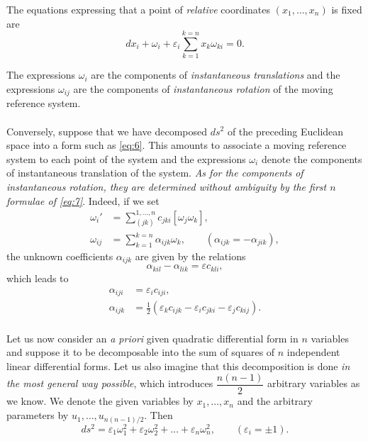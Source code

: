 \documentclass[leqno,12pt]{article}
\makeatletter
\let\old@epsilon\epsilon
\let\old@varepsilon\varepsilon
\let\epsilon\old@varepsilon
\let\varepsilon\old@epsilon
\theoremstyle{shape1}
\theoremstyle{shape0}
\theoremstyle{shape2}
\theoremstyle{definition}
\makeatother
\begin{document}
The equations expressing that a point of \emph{relative} coordinates $(x_{1},\dots,x_{n})$ is fixed are
\begin{equation}
  \label{eq:8}
  dx_{i}+\omega_{i}+\epsilon_{i}\sum_{k=1}^{k=n}x_{k}\omega_{ki}=0.
\end{equation}

The expressions $\omega_{i}$ are the components of \emph{instantaneous translations} and the expressions $\omega_{ij}$ are the components of \emph{instantaneous rotation} of the moving reference system.

\paragraph{}
\label{sec:4}
Conversely, suppose that we have decomposed $ds^{2}$ of the preceding Euclidean space into a form such as \eqref{eq:6}. This amounts to associate a moving reference system to each point of the system and the expressions $\omega_{i}$ denote the components of instantaneous translation of the system. \emph{As for the components of instantaneous rotation, they are determined without ambiguity by the first $n$ formulae of \eqref{eq:7}}. Indeed, if we set
\begin{align*}
  \omega_{i}'&=\sum_{(jk)}^{1,\dots,n}c_{jki}[\omega_{j}\omega_{k}],\\
  \omega_{ij}&=\sum_{k=1}^{k=n}\alpha_{ijk}\omega_{k},\qquad(\alpha_{ijk}=-\alpha_{jik}),
\end{align*}
the unknown coefficients $\alpha_{ijk}$ are given by the relations
\[
\alpha_{kil}-\alpha_{lik}=\epsilon c_{kli},
\]
which leads to
\begin{align*}
  \alpha_{iji}&=\epsilon_{i}c_{iji},\\
  \alpha_{ijk}&=\frac{1}{2}(\epsilon_{k}c_{ijk}-\epsilon_{i}c_{jki}-\epsilon_{j}c_{kij}).
\end{align*}

\paragraph{}
\label{sec:5}
Let us now consider an \emph{a priori} given quadratic differential form in $n$ variables and suppose it to be decomposable into the sum of squares of $n$ independent linear differential forms. Let us also imagine that this decomposition is done \emph{in the most general way possible}, which introduces $\dfrac{n(n-1)}{2}$ arbitrary variables as we know. We denote the given variables by $x_{1},\dots,x_{n}$ and the arbitrary parameters by $u_{1},\dots,u_{n(n-1)/2}$. Then
\begin{equation}
  \label{eq:9}
  ds^{2}=\epsilon_{1}\omega_{1}^{2}+\epsilon_{2}\omega_{2}^{2}+\dots+\epsilon_{n}\omega_{n}^{2},\qquad (\epsilon_{i}=\pm 1).
\end{equation}
\end{document}
